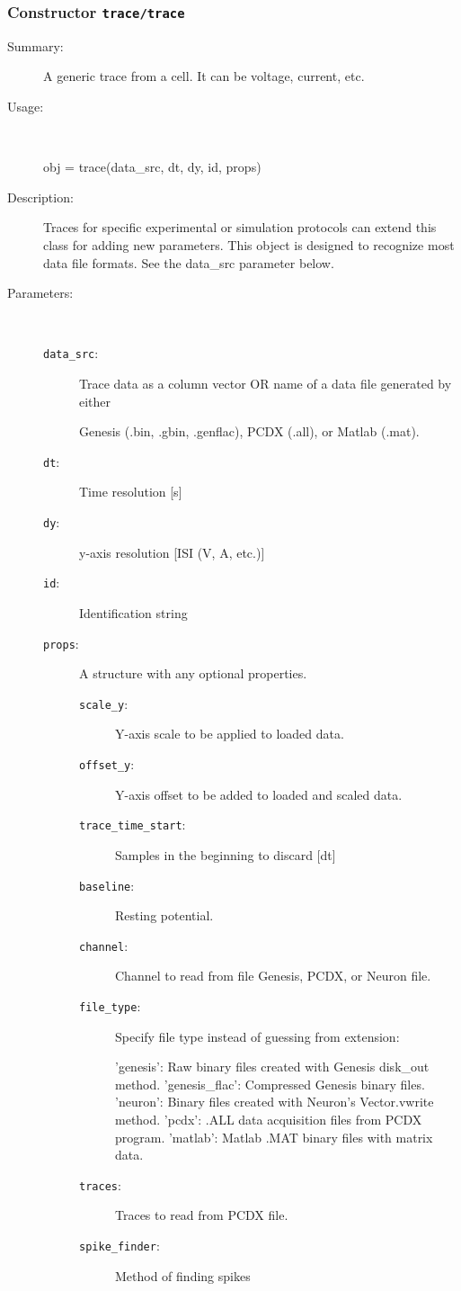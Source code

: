 \subsubsection[Constructor \texttt{trace}]{Constructor \texttt{trace/trace}}%
%
\label{ref_trace__trace}%
\hypertarget{ref_trace__trace}{}%
\begin{description}
\item[Summary:]A generic trace from a cell. It can be voltage, current, etc.
%
\item[Usage:]~%
\begin{lyxcode}%
obj = trace(data\_src, dt, dy, id, props)
%
\end{lyxcode}%
%
\item[Description:]%
Traces for specific experimental or simulation protocols can extend 
 this class for adding new parameters. This object is designed to recognize
 most data file formats. See the data\_src parameter below.
\item[Parameters:]~
\begin{description}%
\item[\texttt{data\_src}:]
 Trace data as a column vector OR name of a data file generated by either 

Genesis (.bin, .gbin, .genflac), PCDX (.all), or Matlab (.mat).\item[\texttt{dt}:]
 Time resolution [s]
\item[\texttt{dy}:]
 y-axis resolution [ISI (V, A, etc.)]
\item[\texttt{id}:]
 Identification string
\item[\texttt{props}:]
 A structure with any optional properties.
\begin{description}%
\item[\texttt{scale\_y}:]
 Y-axis scale to be applied to loaded data.
\item[\texttt{offset\_y}:]
 Y-axis offset to be added to loaded and scaled data.
\item[\texttt{trace\_time\_start}:]
 Samples in the beginning to discard [dt]
\item[\texttt{baseline}:]
 Resting potential.
\item[\texttt{channel}:]
 Channel to read from file Genesis, PCDX, or Neuron file.
\item[\texttt{file\_type}:]
 Specify file type instead of guessing from extension:

'genesis': Raw binary files created with Genesis disk\_out method.
'genesis\_flac': Compressed Genesis binary files.
'neuron': Binary files created with Neuron's Vector.vwrite method.
'pcdx': .ALL data acquisition files from PCDX program.
'matlab': Matlab .MAT binary files with matrix data.\item[\texttt{traces}:]
 Traces to read from PCDX file.
\item[\texttt{spike\_finder}:]
 Method of finding spikes 


\end{description}
\end{description}
\end{description}
